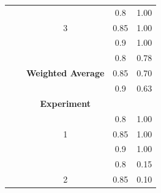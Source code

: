 \documentclass{mpaper}
\begin{document}
\begin{table}[]
\begin{tabular}{|l|c|ccc|}
                                            &                 & \multicolumn{1}{c|}{}                          & \multicolumn{1}{c|}{0.8}                & 1.00               \\
                                            &                 & \multicolumn{1}{c|}{3}                         & \multicolumn{1}{c|}{0.85}               & 1.00               \\
                                            &                 & \multicolumn{1}{c|}{}                          & \multicolumn{1}{c|}{0.9}                & 1.00               \\ \cline{3-5} 
                                            &                 & \multicolumn{1}{l|}{}                          & \multicolumn{1}{c|}{0.8}                & 0.78               \\
                                            &                 & \multicolumn{1}{c|}{\textbf{Weighted Average}} & \multicolumn{1}{c|}{0.85}               & 0.70               \\
                                            &                 & \multicolumn{1}{l|}{}                          & \multicolumn{1}{c|}{0.9}                & 0.63               \\ \hline
                                            &                 & \multicolumn{1}{c|}{\textbf{Experiment}}       & \multicolumn{1}{c|}{}                   & \textbf{}          \\ \cline{3-5} 
                                            &                 & \multicolumn{1}{c|}{}                          & \multicolumn{1}{c|}{0.8}                & 1.00               \\
                                            &                 & \multicolumn{1}{c|}{1}                         & \multicolumn{1}{c|}{0.85}               & 1.00               \\
                                            &                 & \multicolumn{1}{c|}{}                          & \multicolumn{1}{c|}{0.9}                & 1.00               \\ \cline{3-5} 
                                            &                 & \multicolumn{1}{c|}{}                          & \multicolumn{1}{c|}{0.8}                & 0.15               \\
                                            & \textbf{}       & \multicolumn{1}{c|}{2}                         & \multicolumn{1}{c|}{0.85}               & 0.10               \\

\end{tabular}
\end{table}
\end{document}
